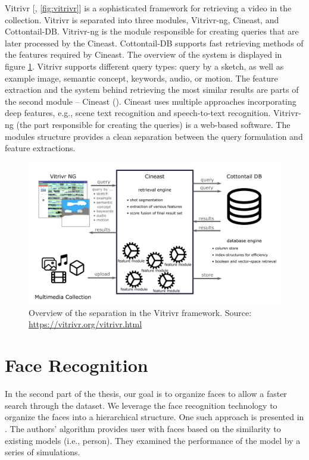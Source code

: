 Vitrivr [\cite{rossetto2016vitrivr}, \autoref{fig:vitrivr}] is a sophisticated framework for retrieving a video in the collection. Vitrivr is separated into three modules, Vitrivr-ng, Cineast, and Cottontail-DB.  Vitrivr-ng is the module responsible for creating queries that are later processed by the Cineast. Cottontail-DB supports fast retrieving methods of the features required by Cineast. The overview of the system is displayed in figure \ref{fig:vitrivr}. Vitrivr supports different query types: query by a sketch, as well as example image, semantic concept, keywords, audio, or motion. The feature extraction and the system behind retrieving the most similar results are parts of the second module -- Cineast (\cite{rossetto2016searching}). Cineast uses multiple approaches incorporating deep features, e.g., scene text recognition and speech-to-text recognition. Vitrivr-ng (the part responsible for creating the queries) is a web-based software. The modules structure provides a clean separation between the query formulation and feature extractions.

\begin{figure}
    \centering
    \includegraphics[width=\linewidth]{img/vitrivr.png}
    \caption{Overview of the separation in the Vitrivr framework. Source: \url{https://vitrivr.org/vitrivr.html}}
    \label{fig:vitrivr}
\end{figure}

\section{Face Recognition}

In the second part of the thesis, our goal is to organize faces to allow a faster search through the dataset. We leverage the face recognition technology to organize the faces into a hierarchical structure. One such approach is presented in \citep{girgensohn2004leveraging}. The authors' algorithm provides user with faces based on the similarity to existing models (i.e., person). They examined the performance of the model by a series of simulations. 

